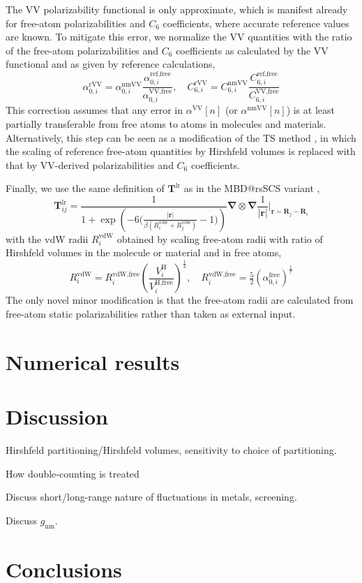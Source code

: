 The VV polarizability functional is only approximate, which is manifest already for free-atom polarizabilities and $C_6$ coefficients, where accurate reference values are known.
To mitigate this error, we normalize the VV quantities with the ratio of the free-atom polarizabilities and $C_6$ coefficients as calculated by the VV functional and as given by reference calculations,
\begin{equation}
  \alpha_{0,i}^\text{rVV}=\alpha_{0,i}^\text{nmVV}\frac{\alpha_{0,i}^\text{ref,free}}{\alpha_{0,i}^\text{VV,free}},\quad
  C_{6,i}^\text{rVV}=C_{6,i}^\text{nmVV}\frac{C_{6,i}^\text{ref,free}}{C_{6,i}^\text{VV,free}}
\end{equation}
This correction assumes that any error in $\alpha^\text{VV}[n]$ (or $\alpha^\text{nmVV}[n]$) is at least partially transferable from free atoms to atoms in molecules and materials.
Alternatively, this step can be seen as a modification of the TS method \citep{TkatchenkoPRL09}, in which the scaling of reference free-atom quantities by Hirshfeld volumes is replaced with that by VV-derived polarizabilities and $C_6$ coefficients.

Finally, we use the same definition of $\mathbf T^\text{lr}$ as in the MBD@rsSCS variant \citep{AmbrosettiJCP14},
\begin{equation}
  \mathbf T_{ij}^\text{lr}=\frac1{1+\exp\left(-6\Big(\frac{|\mathbf r|}{\beta(R_i^\text{vdw}+R_j^\text{vdw})}-1\Big)\!\!\right)}\boldsymbol\nabla\otimes\boldsymbol\nabla\frac1{|\mathbf r|}\Bigg|_{\mathbf r=\mathbf R_j-\mathbf R_i}
\end{equation}
with the vdW radii $R_i^\text{vdW}$ obtained by scaling free-atom radii with ratio of Hirshfeld volumes in the molecule or material and in free atoms,
\begin{equation}
  R_i^\text{vdW}=R_i^\text{vdW,free}\left(\frac{V_i^\text{H}}{V_i^\text{H,free}}\right)^\frac13,\quad
  R_i^\text{vdW,free}=\tfrac52(\alpha_{0,i}^\text{free})^\frac17
\end{equation}
The only novel minor modification is that the free-atom radii are calculated from free-atom static polarizabilities \citep{Dima} rather than taken as external input.

\section{Numerical results}

\section{Discussion}

Hirshfeld partitioning/Hirshfeld volumes, sensitivity to choice of partitioning.

How double-counting is treated

Discuss short/long-range nature of fluctuations in metals, screening.

Discuss $g_\text{nm}$.

\section{Conclusions}
